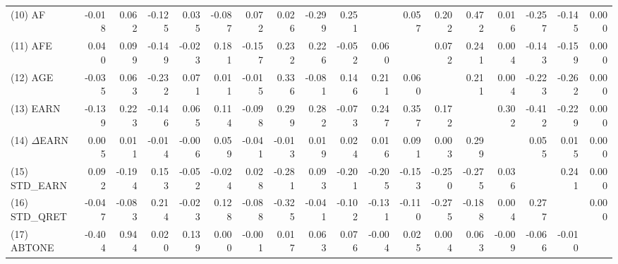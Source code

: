 \begin{table}[htbp]
\begin{tabular}{lrrrrrrrrrrrrrrrrr}
    (10) AF & -0.018 & 0.062 & -0.125 & 0.035 & -0.087 & 0.072 & 0.026 & -0.299 & 0.251 &  & 0.057 & 0.202 & 0.472 & 0.016 & -0.257 & -0.145 & 0.000 \\
    (11) AFE & 0.040 & 0.099 & -0.149 & -0.023 & 0.181 & -0.157 & 0.232 & 0.226 & -0.052 & 0.060 &  & 0.072 & 0.241 & 0.004 & -0.143 & -0.159 & 0.000 \\
    (12) AGE & -0.035 & 0.063 & -0.232 & 0.071 & 0.011 & -0.015 & 0.336 & -0.081 & 0.146 & 0.211 & 0.060 &  & 0.211 & 0.004 & -0.223 & -0.262 & 0.000 \\
    (13) EARN & -0.139 & 0.223 & -0.146 & 0.065 & 0.114 & -0.098 & 0.299 & 0.282 & -0.073 & 0.247 & 0.357 & 0.172 &  & 0.302 & -0.412 & -0.229 & 0.000 \\
    (14) $\Delta$EARN & 0.005 & 0.011 & -0.014 & -0.006 & 0.059 & -0.041 & -0.013 & 0.019 & 0.024 & 0.016 & 0.091 & 0.003 & 0.299 &  & 0.055 & 0.015 & 0.000 \\
    (15) STD\_EARN & 0.092 & -0.194 & 0.153 & -0.052 & -0.024 & 0.028 & -0.281 & 0.093 & -0.201 & -0.205 & -0.153 & -0.250 & -0.275 & 0.036 &  & 0.241 & 0.000 \\
    (16) STD\_QRET & -0.047 & -0.083 & 0.214 & -0.023 & 0.128 & -0.088 & -0.325 & -0.041 & -0.102 & -0.131 & -0.110 & -0.275 & -0.188 & 0.004 & 0.277 &  & 0.000 \\
    (17) ABTONE & -0.404 & 0.944 & 0.020 & 0.139 & 0.000 & -0.001 & 0.017 & 0.063 & 0.076 & -0.004 & 0.025 & 0.004 & 0.063 & -0.009 & -0.066 & -0.010 &  \\
    \bottomrule
    \bottomrule
    \end{tabular}%
\end{table}%